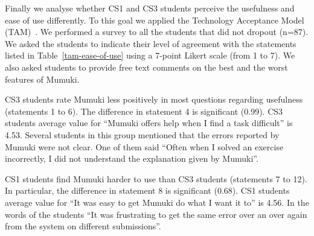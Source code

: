 Finally we analyse whether CS1 and CS3 students perceive the usefulness and ease of use differently. To this goal we applied the Technology Acceptance Model (TAM)~\cite{Chuttur:2009}. We performed a survey to all the students that did not dropout (n=87). We asked the students to indicate their level of agreement with the statements listed in Table~\ref{tam-ease-of-use} using a 7-point Likert scale (from 1 to 7). We also asked students to provide free text comments on the best and the worst features of Mumuki.  

CS3 students rate Mumuki less positively in most questions regarding usefulness (statements 1 to 6). The difference in statement 4 is significant (0.99). CS3 students average value for ``Mumuki offers help when I find a task difficult'' is 4.53. 
Several students in this group mentioned that the errors reported by Mumuki were not clear. One of them said ``Often when I solved an exercise incorrectly, I did not understand the explanation given by Mumuki''.  

CS1 students find Mumuki harder to use than CS3 students (statements 7 to 12). In particular, the difference in statement 8 is significant (0.68). CS1 students average value for ``It was easy to get Mumuki do what I want it to'' is 4.56. 
In the words of the students ``It was frustrating to get the same error over an over again from the system on different submissions''.

